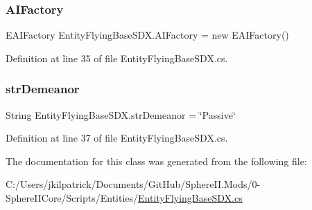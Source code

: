 \subsubsection{\texorpdfstring{AIFactory}{AIFactory}}
{\footnotesize\ttfamily E\+A\+I\+Factory Entity\+Flying\+Base\+S\+D\+X.\+A\+I\+Factory = new E\+A\+I\+Factory()\hspace{0.3cm}{\ttfamily [static]}}



Definition at line 35 of file Entity\+Flying\+Base\+S\+D\+X.\+cs.

\mbox{\label{class_entity_flying_base_s_d_x_a2f082afb7876cd6cb28888971cbc9e2d}} 
\subsubsection{\texorpdfstring{strDemeanor}{strDemeanor}}
{\footnotesize\ttfamily String Entity\+Flying\+Base\+S\+D\+X.\+str\+Demeanor = \char`\"{}Passive\char`\"{}}



Definition at line 37 of file Entity\+Flying\+Base\+S\+D\+X.\+cs.



The documentation for this class was generated from the following file\+:\begin{DoxyCompactItemize}
\item 
C\+:/\+Users/jkilpatrick/\+Documents/\+Git\+Hub/\+Sphere\+I\+I.\+Mods/0-\/\+Sphere\+I\+I\+Core/\+Scripts/\+Entities/\mbox{\hyperlink{_entity_flying_base_s_d_x_8cs}{Entity\+Flying\+Base\+S\+D\+X.\+cs}}\end{DoxyCompactItemize}
